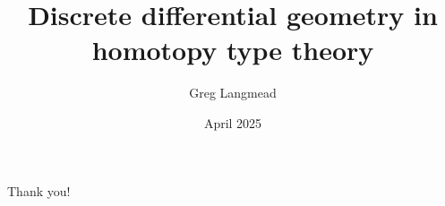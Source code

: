 \documentclass[handout,13pt,aspectratio=169]{beamer}
\title[Geometry in HoTT]{Discrete differential geometry in homotopy type theory}
\author{Greg Langmead}
\institute[CMU]{Carnegie Mellon University}
\date{April 2025}
\begin{document}
\begin{frame}
\titlepage
\end{frame}









\begin{frame}
\begin{center}
\alert{\huge{Thank you!}}
\end{center}
\end{frame}
\end{document}
